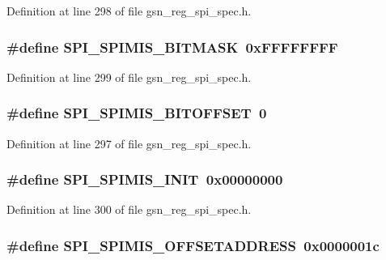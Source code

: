 Definition at line 298 of file gsn\_\-reg\_\-spi\_\-spec.h.

\hypertarget{a00573_a24a2e0fa5878b0c6949ad82bb66a7992}{
\subsubsection[{SPI\_\-SPIMIS\_\-BITMASK}]{\setlength{\rightskip}{0pt plus 5cm}\#define SPI\_\-SPIMIS\_\-BITMASK~0xFFFFFFFF}}
\label{a00573_a24a2e0fa5878b0c6949ad82bb66a7992}


Definition at line 299 of file gsn\_\-reg\_\-spi\_\-spec.h.

\hypertarget{a00573_abbf262ace71c155ba67496acc7dd735a}{
\subsubsection[{SPI\_\-SPIMIS\_\-BITOFFSET}]{\setlength{\rightskip}{0pt plus 5cm}\#define SPI\_\-SPIMIS\_\-BITOFFSET~0}}
\label{a00573_abbf262ace71c155ba67496acc7dd735a}


Definition at line 297 of file gsn\_\-reg\_\-spi\_\-spec.h.

\hypertarget{a00573_ace9032ae14156b64859571b63c291893}{
\subsubsection[{SPI\_\-SPIMIS\_\-INIT}]{\setlength{\rightskip}{0pt plus 5cm}\#define SPI\_\-SPIMIS\_\-INIT~0x00000000}}
\label{a00573_ace9032ae14156b64859571b63c291893}


Definition at line 300 of file gsn\_\-reg\_\-spi\_\-spec.h.

\hypertarget{a00573_adc1d8bcb31e8c25fd6524d7cebb6ed75}{
\subsubsection[{SPI\_\-SPIMIS\_\-OFFSETADDRESS}]{\setlength{\rightskip}{0pt plus 5cm}\#define SPI\_\-SPIMIS\_\-OFFSETADDRESS~0x0000001c}}
\label{a00573_adc1d8bcb31e8c25fd6524d7cebb6ed75}


